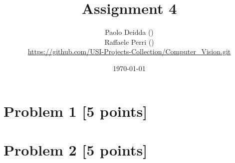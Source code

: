 \documentclass[12pt]{article}
\author{
	Paolo Deidda (\text{paolo.deidda@usi.ch}) \\ 
    Raffaele Perri (\text{raffaele.perri@usi.ch}) \\
    \url{https://github.com/USI-Projects-Collection/Computer_Vision.git}
}
\date{\today}
\begin{document}
\title{Assignment 4}
\maketitle

\section*{Problem 1 [5 points]}


\newpage

\section*{Problem 2 [5 points]}

\end{document}

